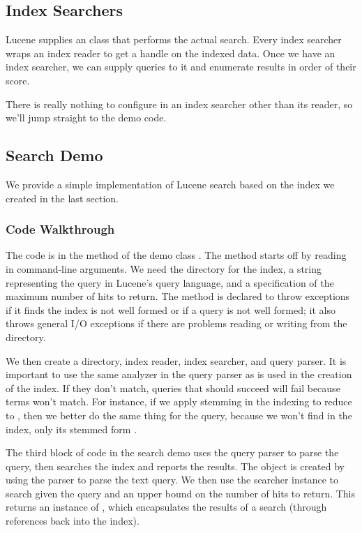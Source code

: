 \subsection{Index Searchers}

Lucene supplies an  class that performs the actual
search.  Every index searcher wraps an index reader to get a handle
on the indexed data.  Once we have an index searcher, we can supply
queries to it and enumerate results in order of their score.

There is really nothing to configure in an index searcher other
than its reader, so we'll jump straight to the demo code.

\subsection{Search Demo}

We provide a simple implementation of Lucene search based on the index
we created in the last section.  

\subsubsection{Code Walkthrough}

The code is in the  method of the demo class
.  The method starts off by reading in command-line
arguments.
%
%
We need the directory for the index, a string representing the query
in Lucene's query language, and a specification of the maximum number
of hits to return.  The method is declared to throw exceptions if it
finds the index is not well formed or if a query is not well formed;
it also throws general I/O exceptions if there are problems reading or
writing from the directory.

We then create a directory, index reader, index searcher, and
query parser.
%
%
It is important to use the same analyzer in the query parser as is
used in the creation of the index.  If they don't match, queries that
should succeed will fail because terms won't match.  For instance, if
we apply stemming in the indexing to reduce  to
, then we better do the same thing for the query,
because we won't find  in the index, only its
stemmed form .

The third block of code in the search demo uses the query parser
to parse the query, then searches the index and reports the results.
%
%
The  object is created by using the parser to parse the
text query.  We then use the searcher instance to search given the
query and an upper bound on the number of hits to return.  This
returns an instance of , which encapsulates the results
of a search (through references back into the index).

